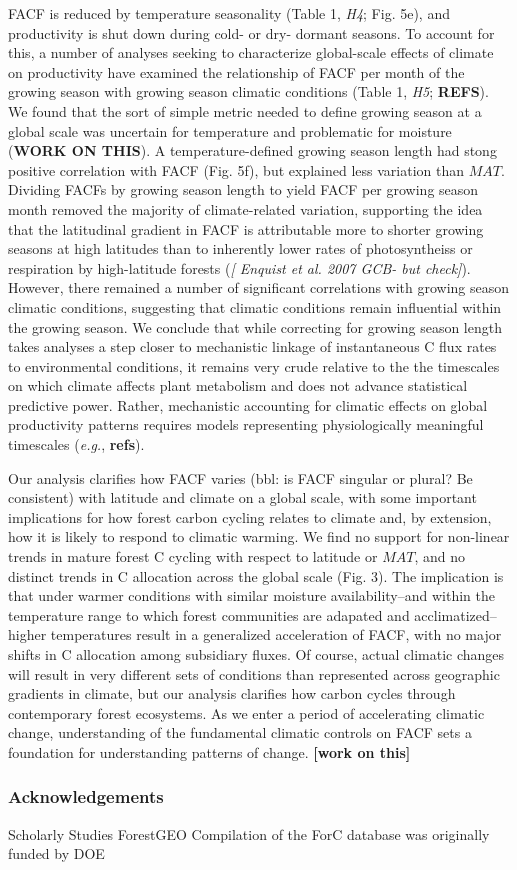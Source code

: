 \documentclass[]{article}
\begin{document}
FACF is reduced by temperature seasonality (Table 1, \emph{H4}; Fig.
5e), and productivity is shut down during cold- or dry- dormant seasons.
To account for this, a number of analyses seeking to characterize
global-scale effects of climate on productivity have examined the
relationship of FACF per month of the growing season with growing season
climatic conditions (Table 1, \emph{H5}; \textbf{REFS}). We found that
the sort of simple metric needed to define growing season at a global
scale was uncertain for temperature and problematic for moisture
(\textbf{WORK ON THIS}). A temperature-defined growing season length had
stong positive correlation with FACF (Fig. 5f), but explained less
variation than \(MAT\). Dividing FACFs by growing season length to yield
FACF per growing season month removed the majority of climate-related
variation, supporting the idea that the latitudinal gradient in FACF is
attributable more to shorter growing seasons at high latitudes than to
inherently lower rates of photosyntheiss or respiration by high-latitude
forests (\emph{{[} Enquist et al. 2007 GCB- but check{]}}). However,
there remained a number of significant correlations with growing season
climatic conditions, suggesting that climatic conditions remain
influential within the growing season. We conclude that while correcting
for growing season length takes analyses a step closer to mechanistic
linkage of instantaneous C flux rates to environmental conditions, it
remains very crude relative to the the timescales on which climate
affects plant metabolism and does not advance statistical predictive
power. Rather, mechanistic accounting for climatic effects on global
productivity patterns requires models representing physiologically
meaningful timescales (\emph{e.g.}, \textbf{refs}).

Our analysis clarifies how FACF varies (bbl: is FACF singular or plural?
Be consistent) with latitude and climate on a global scale, with some
important implications for how forest carbon cycling relates to climate
and, by extension, how it is likely to respond to climatic warming. We
find no support for non-linear trends in mature forest C cycling with
respect to latitude or \(MAT\), and no distinct trends in C allocation
across the global scale (Fig. 3). The implication is that under warmer
conditions with similar moisture availability--and within the
temperature range to which forest communities are adapated and
acclimatized--higher temperatures result in a generalized acceleration
of FACF, with no major shifts in C allocation among subsidiary fluxes.
Of course, actual climatic changes will result in very different sets of
conditions than represented across geographic gradients in climate, but
our analysis clarifies how carbon cycles through contemporary forest
ecosystems. As we enter a period of accelerating climatic change,
understanding of the fundamental climatic controls on FACF sets a
foundation for understanding patterns of change. \textbf{{[}work on
this{]}}

\subsubsection{Acknowledgements}\label{acknowledgements}

Scholarly Studies ForestGEO Compilation of the ForC database was
originally funded by DOE


\end{document}
